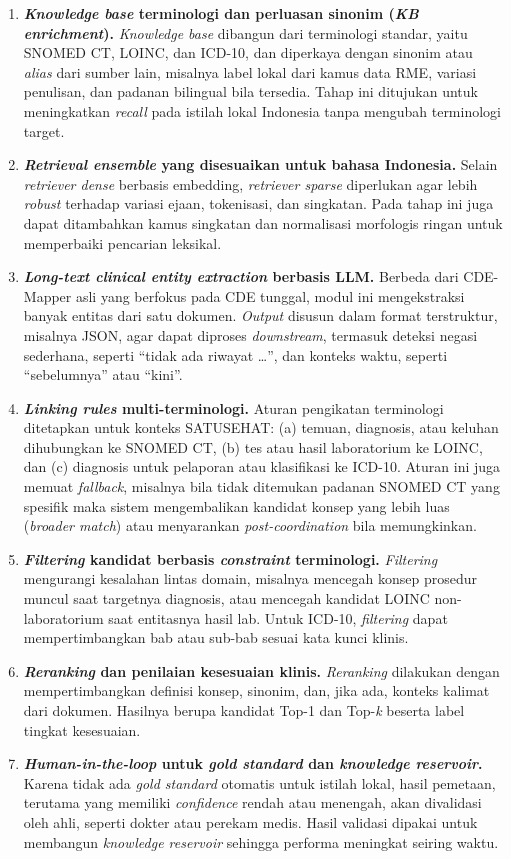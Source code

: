 \begin{enumerate}
    \item \textbf{\textit{Knowledge base} terminologi dan perluasan sinonim (\textit{KB enrichment}).} \textit{Knowledge base} dibangun dari terminologi standar, yaitu SNOMED CT, LOINC, dan ICD-10, dan diperkaya dengan sinonim atau \textit{alias} dari sumber lain, misalnya label lokal dari kamus data RME, variasi penulisan, dan padanan bilingual bila tersedia. Tahap ini ditujukan untuk meningkatkan \textit{recall} pada istilah lokal Indonesia tanpa mengubah terminologi target.
    \item \textbf{\textit{Retrieval ensemble} yang disesuaikan untuk bahasa Indonesia.} Selain \textit{retriever dense} berbasis embedding, \textit{retriever sparse} diperlukan agar lebih \textit{robust} terhadap variasi ejaan, tokenisasi, dan singkatan. Pada tahap ini juga dapat ditambahkan kamus singkatan dan normalisasi morfologis ringan untuk memperbaiki pencarian leksikal.
    \item \textbf{\textit{Long-text clinical entity extraction} berbasis LLM.} Berbeda dari CDE-Mapper asli yang berfokus pada CDE tunggal, modul ini mengekstraksi banyak entitas dari satu dokumen. \textit{Output} disusun dalam format terstruktur, misalnya JSON, agar dapat diproses \textit{downstream}, termasuk deteksi negasi sederhana, seperti ``tidak ada riwayat \ldots'', dan konteks waktu, seperti ``sebelumnya'' atau ``kini''.
    \item \textbf{\textit{Linking rules} multi-terminologi.} Aturan pengikatan terminologi ditetapkan untuk konteks SATUSEHAT: (a) temuan, diagnosis, atau keluhan dihubungkan ke SNOMED CT, (b) tes atau hasil laboratorium ke LOINC, dan (c) diagnosis untuk pelaporan atau klasifikasi ke ICD-10. Aturan ini juga memuat \textit{fallback}, misalnya bila tidak ditemukan padanan SNOMED CT yang spesifik maka sistem mengembalikan kandidat konsep yang lebih luas (\textit{broader match}) atau menyarankan \textit{post-coordination} bila memungkinkan.
    \item \textbf{\textit{Filtering} kandidat berbasis \textit{constraint} terminologi.} \textit{Filtering} mengurangi kesalahan lintas domain, misalnya mencegah konsep prosedur muncul saat targetnya diagnosis, atau mencegah kandidat LOINC non-laboratorium saat entitasnya hasil lab. Untuk ICD-10, \textit{filtering} dapat mempertimbangkan bab atau sub-bab sesuai kata kunci klinis.
    \item \textbf{\textit{Reranking} dan penilaian kesesuaian klinis.} \textit{Reranking} dilakukan dengan mempertimbangkan definisi konsep, sinonim, dan, jika ada, konteks kalimat dari dokumen. Hasilnya berupa kandidat Top-1 dan Top-\textit{k} beserta label tingkat kesesuaian.
    \item \textbf{\textit{Human-in-the-loop} untuk \textit{gold standard} dan \textit{knowledge reservoir}.} Karena tidak ada \textit{gold standard} otomatis untuk istilah lokal, hasil pemetaan, terutama yang memiliki \textit{confidence} rendah atau menengah, akan divalidasi oleh ahli, seperti dokter atau perekam medis. Hasil validasi dipakai untuk membangun \textit{knowledge reservoir} sehingga performa meningkat seiring waktu.
\end{enumerate}


